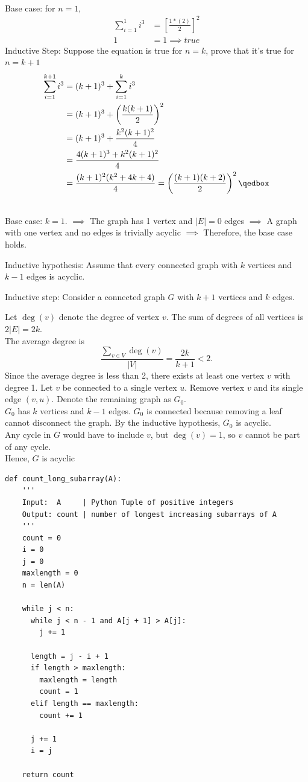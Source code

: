 \documentclass[12pt,twoside]{article}
\begin{document}
\begin{problems}
\problem \\
Base case: for $n = 1$,
\begin{align*}
\sum_{i=1}^{1}i^3 &= [\frac{1*(2)}{2}]^2 \\
1 &= 1 \implies true
\end{align*}
Inductive Step: Suppose the equation is true for $n=k$, prove that it's true for $n=k+1$
\begin{align*}
\sum_{i=1}^{k+1} i^3
  &= (k+1)^3 + \sum_{i=1}^{k} i^3 \\
  &= (k+1)^3 + \left(\frac{k(k+1)}{2}\right)^2 \\
  &= (k+1)^3 + \frac{k^2 (k+1)^2}{4} \\
  &= \frac{4(k+1)^3 + k^2 (k+1)^2}{4} \\
  &= \frac{(k+1)^2 (k^2 + 4k + 4)}{4}
   = \left(\frac{(k+1)(k+2)}{2}\right)^2 \qedbox
\end{align*}

\newpage
\problem \\
Base case: $k = 1$.
$\implies$ The graph has 1 vertex and $|E| = 0$ edges
$\implies$ A graph with one vertex and no edges is trivially acyclic 
$\implies$ Therefore, the base case holds.

Inductive hypothesis: Assume that every connected graph with $k$ vertices and $k-1$ edges is acyclic.

Inductive step: Consider a connected graph $G$ with $k+1$ vertices and $k$ edges.

Let $\deg(v)$ denote the degree of vertex $v$.
The sum of degrees of all vertices is $2|E| = 2k$. \\ 
The average degree is \\
\[\frac{\sum_{v \in V} \deg(v)}{|V|} = \frac{2k}{k+1} < 2.\]
Since the average degree is less than 2, there exists at least one vertex $v$ with degree 1. Let $v$ be connected to a single vertex $u$.
Remove vertex $v$ and its single edge $(v,u)$. Denote the remaining graph as $G_0$.\\
$G_0$ has $k$ vertices and $k-1$ edges.
$G_0$ is connected because removing a leaf cannot disconnect the graph.
By the inductive hypothesis, $G_0$ is acyclic.\\
Any cycle in $G$ would have to include $v$, but $\deg(v) = 1$, so $v$ cannot be part of any cycle.\\
Hence, $G$ is acyclic \qedbox

\problem
\begin{lstlisting}
def count_long_subarray(A):
    '''
    Input:  A     | Python Tuple of positive integers
    Output: count | number of longest increasing subarrays of A
    '''
    count = 0
    i = 0
    j = 0
    maxlength = 0
    n = len(A)
    
    while j < n:
      while j < n - 1 and A[j + 1] > A[j]:
        j += 1
        
      length = j - i + 1
      if length > maxlength:
        maxlength = length
        count = 1
      elif length == maxlength:
        count += 1
      
      j += 1
      i = j
    
    return count
\end{lstlisting}

\end{problems}
\end{document}
